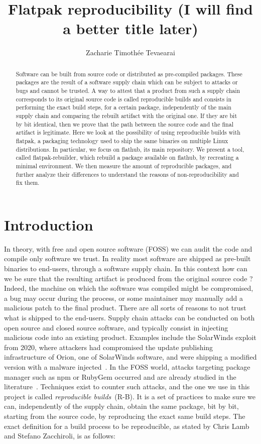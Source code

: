 \documentclass[a4paper,11pt,oneside]{report}
\title{Flatpak reproducibility (I will find a better title later)}
\author{Zacharie Timothée Tevaearai}
\theoremstyle{definition}
\newcommand{\sysname}{flatpak-rebuilder\xspace}
\newcommand{\rb}{reproducible builds\xspace}
\newcommand{\fp}{flatpak\xspace}
\newcommand{\fh}{flathub\xspace}
\begin{document}
\maketitle

\begin{abstract}
Software can be built from source code or distributed as pre-compiled packages.
These packages are the result of a software supply chain which can be
subject to attacks or bugs and cannot be trusted. A way to attest that a
product from such a supply chain corresponds to its original source code is
called \rb and consists in performing the exact build steps, for a certain
package, independently of the main supply chain and comparing the rebuilt
artifact with the original one. If they are bit by bit identical, then we
prove that the path between the source code and the final artifact is
legitimate. Here we look at the possibility of using reproducible builds
with \fp, a packaging technology used to ship the same binaries on multiple
Linux distributions. In particular, we focus on \fh, its main repository. We
present a tool, called \sysname, which rebuild a package available on \fh,
by recreating a minimal environment. We then measure the amount of
reproducible packages, and further analyze their differences to understand
the reasons of non-reproducibility and fix them.
\end{abstract}

\maketoc

\chapter{Introduction}


In theory, with free and open source software (FOSS) we can audit the code and
compile only software we trust. In reality most software are shipped as
pre-built binaries to end-users, through a software supply chain. In this
context how can we be sure that the resulting artifact is produced from the
original source code ? Indeed, the machine on which the software was compiled
might be compromised, a bug may occur during the process, or some maintainer
may manually add a malicious patch to the final product. There are all sorts of
reasons to not trust what is shipped to the end-users. Supply chain attacks can
be conducted on both open source and closed source software, and typically
consist in injecting malicious code into an existing product. Examples include
the SolarWinds exploit from 2020, where attackers had compromised the update
publishing infrastructure of Orion, one of SolarWinds software, and were
shipping a modified version with a malware injected~\cite{enwiki:solarwinds}.
In the FOSS world, attacks targeting package manager such as npm or RubyGem
occurred and are already studied in the
literature~\cite{10.1007/978-3-030-52683-2_2}.
Techniques exist to counter such attacks, and the one we use in this project is
called \emph{\rb}~(R-B). It is a set of practices to make sure we can,
independently of the supply chain, obtain the same package, bit by bit,
starting from the source code, by reproducing the exact same build steps. The
exact definition for a build process to be reproducible, as stated by Chris
Lamb and Stefano Zacchiroli, is as follows:
\end{document}
